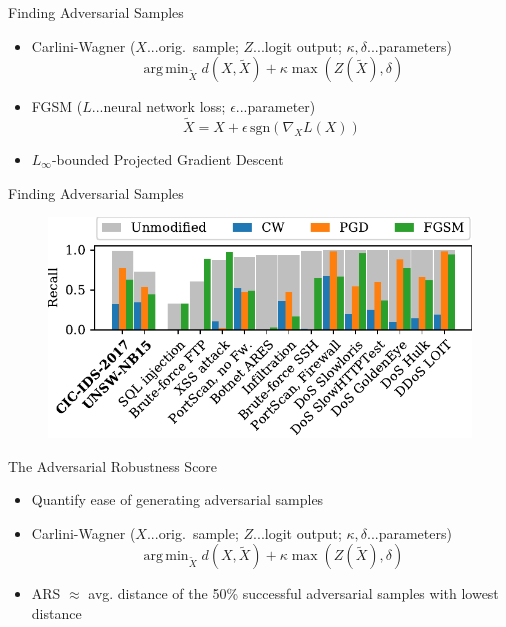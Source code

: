 \documentclass{beamer}
\DeclareMathOperator*{\argmin}{arg\,min}
\begin{document}
\begin{frame}{Finding Adversarial Samples}
\begin{itemize}
\item Carlini-Wagner {\footnotesize ($X$...orig.~sample; $Z$...logit output; $\kappa,\delta$...parameters) \hspace*{-1cm} }
\begin{equation*} \label{eq:carliniWagner}
\argmin_{\tilde X}d(X,\tilde X) + \kappa  \max(Z(\tilde X), \delta)
\end{equation*}
\item FGSM {\footnotesize ($L$...neural network loss; $\epsilon$...parameter) }
\begin{equation*}
\tilde X = X + \epsilon \, \text{sgn}( \nabla_X L(X))
\end{equation*}
\item $L_\infty$-bounded Projected Gradient Descent


\end{itemize}
\end{frame}

\begin{frame}{Finding Adversarial Samples}
\begin{figure}[h]
\includegraphics[width=\columnwidth]{../plots/adv_comparison/adv_comparison_17.pdf}
\end{figure}
\end{frame}

\begin{frame}{The Adversarial Robustness Score}
\begin{itemize}
\item Quantify ease of generating adversarial samples
\item Carlini-Wagner {\footnotesize ($X$...orig.~sample; $Z$...logit output; $\kappa,\delta$...parameters) \hspace*{-1cm} }
\begin{equation*} \label{eq:carliniWagner}
\argmin_{\tilde X} d(X,\tilde X) + \kappa  \max(Z(\tilde X), \delta)
\end{equation*}
\item ARS $\approx$ avg. distance of the 50\% successful adversarial samples with lowest distance
\end{itemize}
\end{frame}
\end{document}
